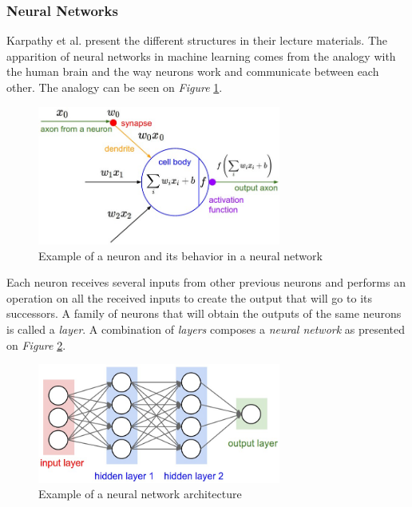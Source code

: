 \subsubsection{Neural Networks}

 Karpathy et al. \cite{Karpathy2015} present the different structures in their lecture materials. The apparition of neural networks in machine learning comes from the analogy with the human brain and the way neurons work and communicate between each other. The analogy can be seen on \emph{Figure} \ref{fig:Neuron}.

\begin{figure}[htbp]
	\centering
		\includegraphics[width=8cm]{Figures/Neuron.png}
	\caption[Neuron Example]{Example of a neuron and its behavior in a neural network \cite{Karpathy2015}}
	\label{fig:Neuron}
\end{figure}

Each neuron receives several inputs from other previous neurons and performs an operation on all the received inputs to create the output that will go to its successors. A family of neurons that will obtain the outputs of the same neurons is called a \emph{layer}. A combination of \emph{layers} composes a \emph{neural network} as presented on \emph{Figure} \ref{fig:NN}.

\begin{figure}[htbp]
	\centering
		\includegraphics[width=8cm]{Figures/NN.png}
	\caption[Neural Network Example]{Example of a neural network architecture \cite{Karpathy2015}}
	\label{fig:NN}
\end{figure}

